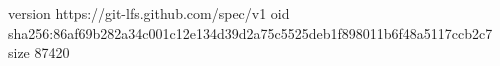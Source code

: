 version https://git-lfs.github.com/spec/v1
oid sha256:86af69b282a34c001c12e134d39d2a75c5525deb1f898011b6f48a5117ccb2c7
size 87420
